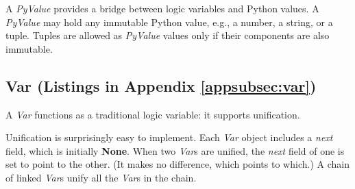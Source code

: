 A \textit{PyValue} provides a bridge between logic variables and Python values. A \textit{PyValue} may hold any immutable Python value, e.g., a number, a string, or a tuple. Tuples are allowed as \textit{PyValue} values only if their components are also immutable. %
\smallv

\subsection{Var (Listings in Appendix \ref{appsubsec:var})} \label{subsec:var}

A \textit{Var} functions as a traditional logic variable: it supports unification. 

Unification is surprisingly easy to implement. Each \textit{Var} object includes a \textit{next} field, which is initially \textbf{None}. When two \textit{Var}s are unified, the \textit{next} field of one is set to point to the other. (It makes no difference, which points to which.) A chain of linked  \textit{Var}s unify all the \textit{Var}s in the chain. 





